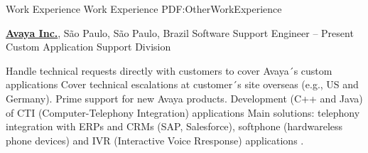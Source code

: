 \documentclass[letterpaper,MMMyyyy,nonstopmode]{simpleresumecv}
\begin{document}
\begin{Body}






\Section
{Work Experience}
{Work Experience}
{PDF:OtherWorkExperience}

\Entry
\href{http://www.avaya.com}
{\textbf{Avaya Inc.}},
São Paulo, São Paulo, Brazil
\Gap
\BulletItem
Software Support Engineer
\hfill
{} --
Present
\newline
Custom Application Support Division
\begin{Detail}
\SubBulletItem
 Handle technical requests directly with customers to cover Avaya´s custom applications
\SubBulletItem
 Cover technical escalations at customer´s site overseas (e.g., US and Germany).
\SubBulletItem
 Prime support for new Avaya products.
\SubBulletItem
 Development (C++ and Java) of CTI (Computer-Telephony Integration) applications
\SubBulletItem
 Main solutions: telephony integration with ERPs and CRMs (SAP, Salesforce), softphone (hardwareless phone devices) and IVR (Interactive Voice Rresponse) applications .
\end{Detail}



\end{Body}
\end{document}
